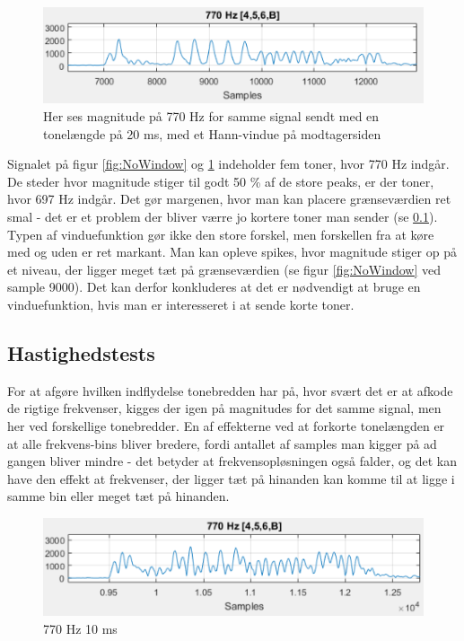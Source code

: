 \begin{figure}[h!]
\centering
\includegraphics[scale=0.8]{Billeder/HannWindow.PNG}
\caption{Her ses magnitude på 770 Hz for samme signal sendt med en tonelængde på 20 ms, med et Hann-vindue på modtagersiden}
\label{fig:HannWindow}
\end{figure}

Signalet på figur \ref{fig:NoWindow} og \ref{fig:HannWindow} indeholder fem toner, hvor 770 Hz indgår. De steder hvor magnitude stiger til godt 50 \% af de store peaks, er der toner, hvor 697 Hz indgår. Det gør margenen, hvor man kan placere grænseværdien ret smal - det er et problem der bliver værre jo kortere toner man sender (se \ref{sec:hastighedstest}). Typen af vinduefunktion gør ikke den store forskel, men forskellen fra at køre med og uden er ret markant. Man kan opleve spikes, hvor magnitude stiger op på et niveau, der ligger meget tæt på grænseværdien (se figur \ref{fig:NoWindow} ved sample 9000). Det kan derfor konkluderes at det er nødvendigt at bruge en vinduefunktion, hvis man er interesseret i at sende korte toner.

\subsection{Hastighedstests} \label{sec:hastighedstest}

For at afgøre hvilken indflydelse tonebredden har på, hvor svært det er at afkode de rigtige frekvenser, kigges der igen på magnitudes for det samme signal, men her ved forskellige tonebredder. En af effekterne ved at forkorte tonelængden er at alle frekvens-bins bliver bredere, fordi antallet af samples man kigger på ad gangen bliver mindre - det betyder at frekvensopløsningen også falder, og det kan have den effekt at frekvenser, der ligger tæt på hinanden kan komme til at ligge i samme bin eller meget tæt på hinanden. 

\begin{figure}[h!]
\centering
\includegraphics[scale=0.8]{Billeder/Speed10ms.PNG}
\caption{770 Hz 10 ms}
\label{fig:10ms}
\end{figure} 

